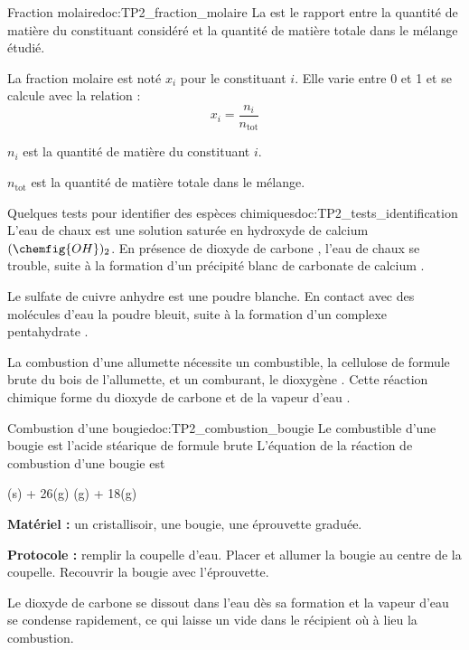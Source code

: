 \begin{doc}{Fraction molaire}{doc:TP2_fraction_molaire}
  La  est le rapport entre la quantité de matière du constituant considéré et la quantité de matière totale dans le mélange étudié.

  La fraction molaire est noté $x_i$ pour le constituant $i$. Elle varie entre 0 et 1 et se calcule avec la relation :
  \begin{equation*}
    x_i = \dfrac{n_i}{n_\text{tot}}
  \end{equation*}

  $n_i$ est la quantité de matière du constituant $i$.

  $n_\text{tot}$ est la quantité de matière totale dans le mélange.
\end{doc}



\begin{doc}{Quelques tests pour identifier des espèces chimiques}{doc:TP2_tests_identification}
  \pointCyan L'eau de chaux est une solution saturée en hydroxyde de calcium  $(\chemfig{OH})_2$.
  En présence de dioxyde de carbone , l'eau de chaux se trouble, suite à la formation d'un précipité blanc de carbonate de calcium .

  \pointCyan Le sulfate de cuivre anhydre  est une poudre blanche.
  En contact avec des molécules d'eau  la poudre bleuit, suite à la formation d'un complexe pentahydrate .

  \pointCyan La combustion d'une allumette nécessite un combustible, la cellulose de formule brute  du bois de l'allumette, et un comburant, le dioxygène .
  Cette réaction chimique forme du dioxyde de carbone  et de la vapeur d'eau .
\end{doc}



\begin{doc}{Combustion d'une bougie}{doc:TP2_combustion_bougie}
  Le combustible d'une bougie est l'acide stéarique de formule brute 
  L'équation de la réaction de combustion d'une bougie est
  \begin{center}
    (s) + 26(g) (g) + 18(g)
  \end{center}

  \textbf{Matériel :} un cristallisoir, une bougie, une éprouvette graduée.

  \textbf{Protocole :} remplir la coupelle d'eau.
  Placer et allumer la bougie au centre de la coupelle.
  Recouvrir la bougie avec l'éprouvette.

  Le dioxyde de carbone se dissout dans l'eau dès sa formation et la vapeur d'eau se condense rapidement, ce qui laisse un vide dans le récipient où à lieu la combustion.
\end{doc}

